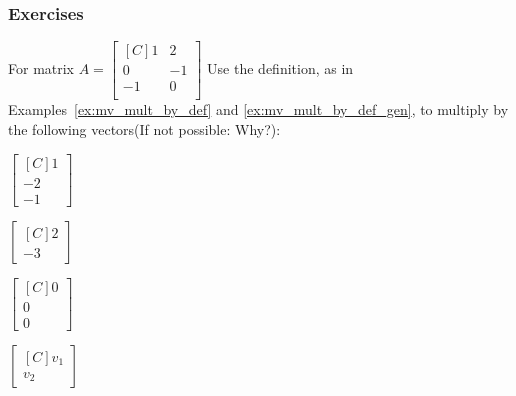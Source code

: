 \subsubsection{Exercises}

\begin{exercise}For matrix 
$A=\begin{bmatrix*}[C]
1  & 2  \\
0  & -1  \\
-1 & 0  \\
\end{bmatrix*}$
Use the definition, as in \\Examples~\ref{ex:mv_mult_by_def}
and \ref{ex:mv_mult_by_def_gen}, to  multiply by the 
following vectors(If not possible: Why?):\\
\begin{inparaenum}[a.)]
\item $\begin{bmatrix*}[C]1 \\ -2 \\ -1 \end{bmatrix*}$\hspace{1cm}
\item $\begin{bmatrix*}[C]2 \\ -3 \end{bmatrix*}$\hspace{1cm}
\item $\begin{bmatrix*}[C]0 \\ 0 \\ 0 \end{bmatrix*}$\hspace{1cm}
\item $\begin{bmatrix*}[C]v_1 \\ v_2 \end{bmatrix*}$
\end{inparaenum}
\end{exercise}

